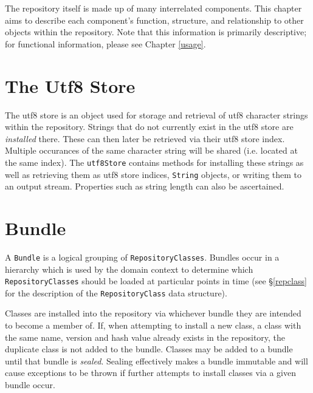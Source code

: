 \documentclass{report}
\begin{document}
The repository itself is made up of many interrelated components. This
chapter aims to describe each component's function, structure, and relationship
to other objects within the repository. Note that this information
is primarily descriptive; for functional information, please see Chapter
\ref{usage}.


\section{The Utf8 Store}\label{utf8store}

The utf8 store is an object used for storage and retrieval of utf8 character
strings within the repository. Strings that do not currently exist in the
utf8 store are {\em installed} there. These can then later be retrieved
via their utf8 store index. Multiple occurances of the same character string
will be shared (i.e. located at the same index). The \texttt{utf8Store}
contains methods for installing these strings as well as retrieving them
as utf8 store indices, \texttt{String} objects, or writing them to an
output stream. Properties such as string length can also be ascertained.

\section{Bundle}

A \texttt{Bundle} is a logical grouping of 
\texttt{Re\-pos\-i\-tory\-Classes}. Bundles occur in a hierarchy which is used
by the domain context to determine which \texttt{Re\-pos\-i\-tory\-Classes} 
should be loaded at particular points in time (see \S \ref{repclass} for
the description of the \texttt{Re\-pos\-i\-tory\-Class} data structure).

Classes are installed into the repository via whichever bundle they are 
intended to become a member of. If, when attempting to install a new class, a 
class with the same name, version and hash value already exists in the 
repository, the duplicate class is not added to the bundle. 
Classes may be added to a bundle until that bundle is {\em sealed}.
Sealing effectively makes a bundle immutable and will cause exceptions to
be thrown if further attempts to install classes via a given bundle occur.
\end{document}
